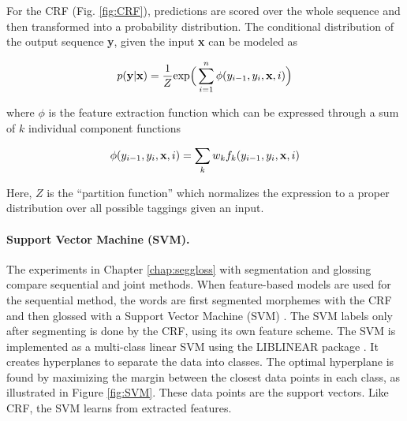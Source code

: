 
For the CRF (Fig. \ref{fig:CRF}), predictions are scored over the whole sequence and then transformed into a probability distribution. The conditional distribution of the output sequence {\bf y}, given the input {\bf x} can be modeled as

\begin{equation}
p(\mathbf{y}|\mathbf{x}) = \frac{1}{Z} \textrm{exp}\Big(\sum_{i=1}^n\phi(y_{i-1}, y_i,\mathbf{x},i)\Big)
\end{equation}

\noindent where $\phi$ is the feature extraction function which can be expressed through a sum of $k$ individual component functions

\begin{equation}
\phi(y_{i-1}, y_i,\mathbf{x},i) = \sum_k w_k f_k(y_{i-1}, y_i,\mathbf{x},i)
\end{equation}

\noindent Here, $Z$ is the ``partition function'' which normalizes the expression to a proper distribution over all possible taggings given an input. 

\paragraph{Support Vector Machine (SVM).} The experiments in Chapter \ref{chap:seggloss} with segmentation and glossing compare sequential and joint methods. When feature-based models are used for the sequential method, the words are first segmented morphemes with the CRF and then glossed with a Support Vector Machine (SVM) \citep{svm_cortes}. The SVM labels only after segmenting is done by the CRF, using its own feature scheme. The SVM is implemented as a multi-class linear SVM using the LIBLINEAR package \citep{fan2008}. It creates hyperplanes to separate the data into classes. The optimal hyperplane is found by maximizing the margin between the closest data points in each class, as illustrated in Figure \ref{fig:SVM}. These data points are the support vectors. Like CRF, the SVM learns from extracted features.

